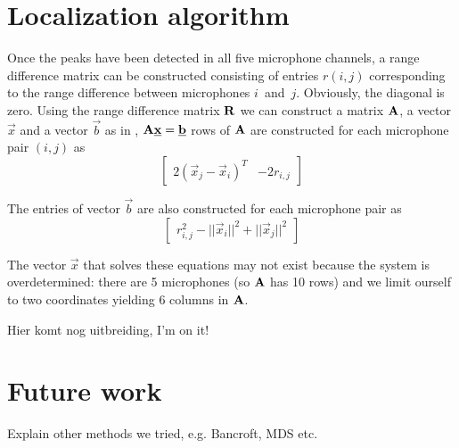 \documentclass[11pt,titlepage]{report}
\begin{document}
\section{Localization algorithm}
\label{sec:loc_alg}
Once the peaks have been detected in all five microphone channels, a range difference matrix can be constructed consisting of entries $r(i,j)$ corresponding to the range difference between microphones $i$~and~$j$. Obviously, the diagonal is zero. 
Using the range difference matrix $\mathbf{R}$ we can construct a matrix $\mathbf{A}$, a vector $\vec{x}$ and a vector $\vec{b}$ as in \cite{epo4-manual}, $\mathbf{A}\mathbf{\underline{x}}=\mathbf{\underline{b}}$ rows of $\mathbf{A}$ are constructed for each microphone pair $(i,j)$ as
\begin{equation}
\begin{bmatrix}
2(\vec{x}_j-\vec{x}_i)^T & -2r_{i,j}
\end{bmatrix}
\end{equation}

The entries of vector $\vec{b}$ are also constructed for each microphone pair as
\begin{equation}
\begin{bmatrix}
r_{i,j}^2-||\vec{x}_i||^2+||\vec{x}_j||^2
\end{bmatrix}
\end{equation}

The vector $\vec{x}$ that solves these equations may not exist because the system is overdetermined: there are \num{5} microphones (so $\mathbf{A}$ has \num{10} rows) and we limit ourself to two coordinates yielding \num{6} columns in $\mathbf{A}$.

Hier komt nog uitbreiding, I'm on it!





\section{Future work}
\label{sec:loc_future}
Explain other methods we tried, e.g. Bancroft, MDS etc.
\end{document}
